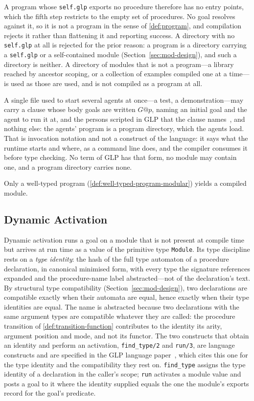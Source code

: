 A program whose \verb|self.glp| exports no procedure therefore has no entry points, which the fifth
step restricts to the empty set of procedures.  No goal resolves against it, so it is not a program
in the sense of \cref{def:program}, and compilation rejects it rather than flattening it and
reporting success.  A directory with no \verb|self.glp| at all is rejected for the prior reason: a
program is a directory carrying a \verb|self.glp| or a self-contained module
(Section~\ref{sec:mod-design}), and such a directory is neither.  A directory of modules that is not
a program---a library reached by ancestor scoping, or a collection of examples compiled one at a
time---is used as those are used, and is not compiled as a program at all.

A single file used to start several agents at once---a test, a demonstration---may carry a clause
whose body goals are written $G@p$, naming an initial goal and the agent to run it at, and the persons
scripted in GLP that the clause names~\cite{shapiro2026implementing}, and nothing else: the agents' program is a
program directory, which the agents load.  That is
invocation notation and not a construct of the language: it says what the runtime starts and where,
as a command line does, and the compiler consumes it before type checking.  No term of GLP has that
form, no module may contain one, and a program directory carries none.

Only a well-typed program (\cref{def:well-typed-program-modular}) yields a compiled module.

\subsection{Dynamic Activation}
\label{sec:dynamic-linking}

Dynamic activation runs a goal on a module that is not present at compile time but arrives at run time as a value of the primitive type \verb|Module|.  Its type discipline rests on a \emph{type identity}: the hash of the full type automaton of a procedure declaration, in canonical minimised form, with every type the signature references expanded and the procedure-name label abstracted---not of the declaration's text.  By structural type compatibility (Section~\ref{sec:mod-design}), two declarations are compatible exactly when their automata are equal, hence exactly when their type identities are equal.  The name is abstracted because two declarations with the same argument types are compatible whatever they are called: the procedure transition of \cref{def:transition-function} contributes to the identity its arity, argument position and mode, and not its functor.  The two constructs that obtain an identity and perform an activation, \verb|find_type/2| and \verb|run/3|, are language constructs and are specified in the GLP language paper~\cite{shapiro2025glp}, which cites this one for the type identity and the compatibility they rest on.  \verb|find_type| assigns the type identity of a declaration in the caller's scope; \verb|run| activates a module value and posts a goal to it where the identity supplied equals the one the module's exports record for the goal's predicate.

